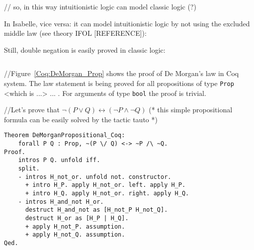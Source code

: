 \documentclass[article]{aaltoseries}
\begin{document}
// so, in this way intuitionistic logic can model classic logic (?)

In Isabelle, vice versa: it can model intuitionistic logic by not using the excluded middle law (see theory IFOL [REFERENCE]):  %

Still, double negation is easily proved in classic logic:
\begin{lstlisting}[language=isabelle]
\end{lstlisting}


//Figure~\ref{Coq:DeMorgan_Prop} shows the proof of De Morgan's law in Coq system. The law statement is being proved for all propositions of type \texttt{Prop}  <which is ...> ... . For arguments of type \texttt{bool} the proof is trivial.

//Let's prove that $\neg (P \lor Q) \leftrightarrow (\neg P \land \neg Q)$
    (* this simple propositional formula can be easily solved by the tactic tauto *)
    
\begin{lstlisting}[language=coq,caption={Proof of propositional logic tautology in Coq: the de Morgan's law for propositions},label={DeMorganPropositional_Coq}]
Theorem DeMorganPropositional_Coq:
    forall P Q : Prop, ~(P \/ Q) <-> ~P /\ ~Q.
Proof.
    intros P Q. unfold iff.
    split.
    - intros H_not_or. unfold not. constructor.
      + intro H_P. apply H_not_or. left. apply H_P.
      + intro H_Q. apply H_not_or. right. apply H_Q.
    - intros H_and_not H_or.
      destruct H_and_not as [H_not_P H_not_Q].
      destruct H_or as [H_P | H_Q].
      + apply H_not_P. assumption.
      + apply H_not_Q. assumption.
Qed.
\end{lstlisting}
\end{document}
